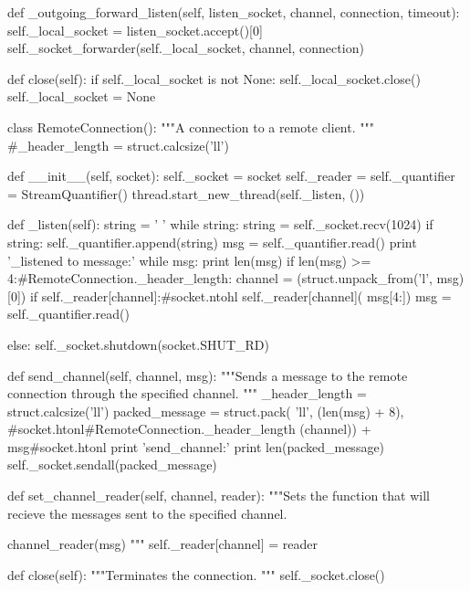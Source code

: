     def _outgoing_forward_listen(self, listen_socket, channel,
                                 connection, timeout):
        self._local_socket = listen_socket.accept()[0]
        self._socket_forwarder(self._local_socket, channel, connection)

    def close(self):
        if self._local_socket is not None:
            self._local_socket.close()
            self._local_socket = None



class RemoteConnection():
    """A connection to a remote client.
    """
    #_header_length = struct.calcsize('ll')
    
    def __init__(self, socket):
        self._socket = socket
        self._reader = {}
        self._quantifier = StreamQuantifier()
        thread.start_new_thread(self._listen, ())

    def _listen(self):
        string = ' '
        while string:
            string = self._socket.recv(1024)
            if string:
                self._quantifier.append(string)
                msg = self._quantifier.read()
                print '_listened to message:'
                while msg:
                    print len(msg)
                    if len(msg) >= 4:#RemoteConnection._header_length:
                        channel = (struct.unpack_from('l', msg)[0])
                        if self._reader[channel]:#socket.ntohl
                            self._reader[channel](
                                msg[4:])
                    msg = self._quantifier.read()

            else:
                self._socket.shutdown(socket.SHUT_RD)

    def send_channel(self, channel, msg):
        """Sends a message to the remote connection through the specified
        channel.
        """
        _header_length = struct.calcsize('ll')
        packed_message = struct.pack(
            'll',
            (len(msg) + 8), #socket.htonl#RemoteConnection._header_length
            (channel)) + msg#socket.htonl
        print 'send_channel:'
        print len(packed_message)
        self._socket.sendall(packed_message)

    def set_channel_reader(self, channel, reader):
        """Sets the function that will recieve the messages sent to the
        specified channel.

        channel_reader(msg)
        """
        self._reader[channel] = reader

    def close(self):
        """Terminates the connection.
        """
        self._socket.close()


